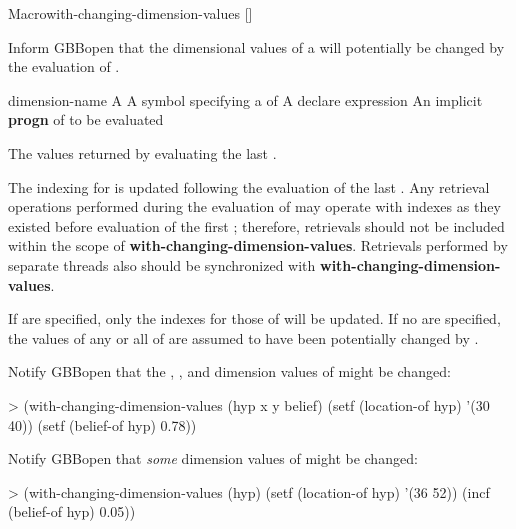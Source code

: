 \documentclass[10pt,twoside,english,pdftex]{article}
\begin{document}
\begin{functiondoc}{Macro}{with-changing-dimension-values}%
  {\code{(} 
         [\superstar{}]\code{)}
    \superstar{}
    \superstar{}
    \returns{} \superstar}
%
  
\fnsyntax

\fnpurpose Inform GBBopen that the dimensional values of a
 will potentially be changed by the evaluation of
.

\fnpackage {}

\fnmodule {}

\fnargs
\begin{args}{dimension-name}
 A 
 A symbol specifying a  of
\arg[declaration] A declare expression
\arg[forms] An implicit \textbf{progn} of  to be evaluated
\end{args}

\fnreturns The values returned by evaluating the last .

\fndescription The indexing for  is updated following the
evaluation of the last .  Any retrieval operations performed during
the evaluation of  may operate with indexes as they existed
before evaluation of the first ; therefore, retrievals should not be
included within the scope of \textbf{with-changing-dimension-values}.
Retrievals performed by separate threads also should be synchronized with
\textbf{with-changing-dimension-values}.

If  are specified, only the indexes for those
 of  will be updated. If no
 are specified, the values of any or all
 of  are assumed to have been
potentially changed by .

\fnexamples Notify GBBopen that the , , and 
dimension values of  might be changed:
%
\W\supp
\begin{example}
> (with-changing-dimension-values (hyp x y belief)
    (setf (location-of hyp) '(30 40))
    (setf (belief-of hyp) 0.78))
\end{example}
%
Notify GBBopen that \textit{some\/} dimension values of  might be
changed:
%
\W\supp\notpretop
\begin{example}
> (with-changing-dimension-values (hyp)
    (setf (location-of hyp) '(36 52))
    (incf (belief-of hyp) 0.05))
\end{example}

\end{functiondoc}
\end{document}
